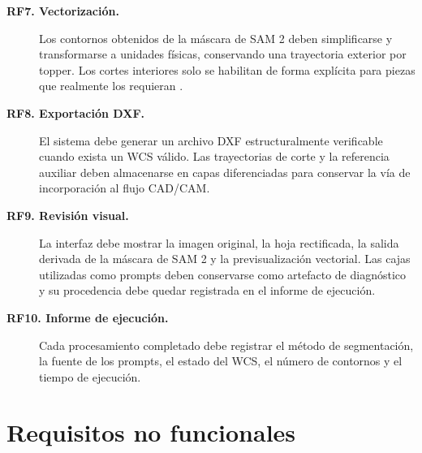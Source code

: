 \begin{description}
    \item[\textbf{RF7. Vectorización.}] Los contornos obtenidos de la máscara de SAM 2 deben simplificarse y transformarse a unidades físicas, conservando una trayectoria exterior por topper. Los cortes interiores solo se habilitan de forma explícita para piezas que realmente los requieran \cite{DouglasPeucker1973}.

    \item[\textbf{RF8. Exportación DXF.}] El sistema debe generar un archivo DXF estructuralmente verificable cuando exista un WCS válido. Las trayectorias de corte y la referencia auxiliar deben almacenarse en capas diferenciadas para conservar la vía de incorporación al flujo CAD/CAM.

    \item[\textbf{RF9. Revisión visual.}] La interfaz debe mostrar la imagen original, la hoja rectificada, la salida derivada de la máscara de SAM 2 y la previsualización vectorial. Las cajas utilizadas como prompts deben conservarse como artefacto de diagnóstico y su procedencia debe quedar registrada en el informe de ejecución.

    \item[\textbf{RF10. Informe de ejecución.}] Cada procesamiento completado debe registrar el método de segmentación, la fuente de los prompts, el estado del WCS, el número de contornos y el tiempo de ejecución.
\end{description}

\section{Requisitos no funcionales}

